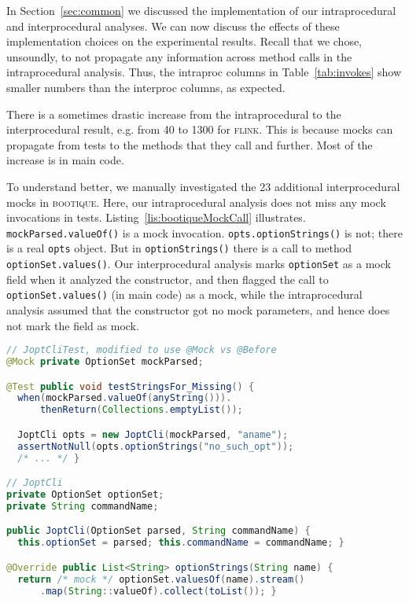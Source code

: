 
In Section~\ref{sec:common} we discussed the implementation of our intraprocedural and interprocedural analyses. We can now discuss the effects of these implementation choices on the experimental results. Recall that we chose, unsoundly, to not propagate any information across method calls in the intraprocedural analysis. Thus, the intraproc columns in Table~\ref{tab:invokes} show smaller numbers than the interproc columns, as expected.

There is a sometimes drastic increase from the intraprocedural to the interprocedural result, e.g. from 40 to 1300 for \textsc{flink}. This is because mocks can propagate from tests to the methods that they call and further. Most of the increase is in main code.

To understand better, we manually investigated the 23 additional interprocedural mocks in \textsc{bootique}. Here, our intraprocedural analysis does not miss any mock invocations in tests. Listing~\ref{lis:bootiqueMockCall} illustrates. \texttt{mockParsed.valueOf()} is a mock invocation. \texttt{opts.optionStrings()} is not; there is a real \texttt{opts} object. But in \texttt{optionStrings()} there is a call to method \texttt{optionSet.values()}. Our interprocedural analysis marks \texttt{optionSet} as a mock field when it analyzed the constructor, and then flagged the call to \texttt{optionSet.values()} (in main code) as a mock, while the intraprocedural analysis assumed that the constructor got no mock parameters, and hence does not mark the field as mock.

\begin{lstlisting}[basicstyle=\ttfamily, caption={An interprocedural mock invocation from boutique's \texttt{JoptCliTest}.},
basicstyle=\scriptsize\ttfamily,language = Java, framesep=4.5mm, escapechar=|,
framexleftmargin=1.0mm, captionpos=b, label=lis:bootiqueMockCall, morekeywords={@Test}]
// JoptCliTest, modified to use @Mock vs @Before
@Mock private OptionSet mockParsed;

@Test public void testStringsFor_Missing() {
  when(mockParsed.valueOf(anyString())).
      thenReturn(Collections.emptyList());

  JoptCli opts = new JoptCli(mockParsed, "aname");
  assertNotNull(opts.optionStrings("no_such_opt"));
  /* ... */ }

// JoptCli
private OptionSet optionSet;
private String commandName;

public JoptCli(OptionSet parsed, String commandName) {
  this.optionSet = parsed; this.commandName = commandName; }

@Override public List<String> optionStrings(String name) {
  return /* mock */ optionSet.valuesOf(name).stream()
      .map(String::valueOf).collect(toList()); }
\end{lstlisting}

